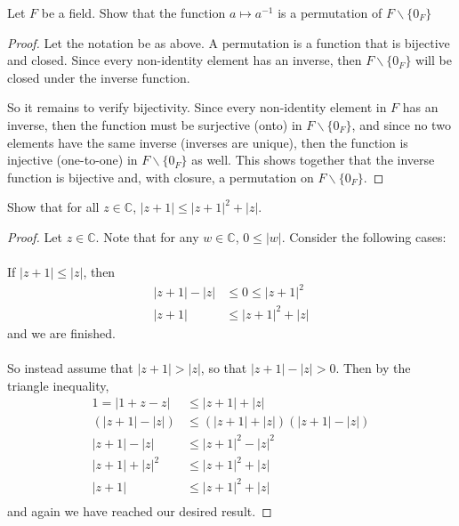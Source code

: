 \documentclass{article}
\begin{document}
\setcounter{problem}{11}
\begin{problem}
Let $F$ be a field. Show that the function $a \mapsto a^{-1}$ is a permutation of $F \backslash \{0_{F}\}$
\end{problem}

\begin{solution}
\begin{proof}
Let the notation be as above. A permutation is a function that is bijective and closed. Since every non-identity element has an inverse, then $F \backslash \{0_{F}\}$ will be closed under the inverse function.

So it remains to verify bijectivity. Since every non-identity element in $F$ has an inverse, then the function must be surjective (onto) in $F \backslash \{0_{F}\}$, and since no two elements have the same inverse (inverses are unique), then the function is injective (one-to-one) in $F \backslash \{0_{F}\}$ as well. This shows together that the inverse function is bijective and, with closure, a permutation on $F \backslash \{0_{F}\}$.
\end{proof}
\end{solution}

\setcounter{problem}{17}
\begin{problem}
Show that for all $z \in \mathbb{C}$, $|z+1| \le |z+1|^{2} + |z|$.
\end{problem}

\begin{solution}
\begin{proof}
Let $z \in \mathbb{C}$. Note that for any $w\in\mathbb{C}$, $0\le |w|$. Consider the following cases: 

\paragraph{}
If $|z+1|\le |z|$, then 
\begin{align*}
|z+1| - |z| &\le 0 \le |z+1|^{2} \\
|z+1| &\le |z+1|^{2} + |z|
\end{align*}
and we are finished.

\paragraph{}
So instead assume that $|z+1| > |z|$, so that $|z+1| - |z| > 0$. Then by the triangle inequality,
\begin{align*}
1 = |1 + z - z| &\le |z+1| + |z| \\
\left( |z+1| - |z| \right) &\le \left( |z+1| + |z| \right) \left( |z+1| - |z| \right) \\
|z+1| - |z| &\le |z+1|^{2} - |z|^{2} \\
|z+1| + |z|^{2} &\le |z+1|^{2} + |z| \\
|z+1| &\le |z+1|^{2} + |z| \\
\end{align*}
and again we have reached our desired result.
\end{proof}
\end{solution}
\end{document}
